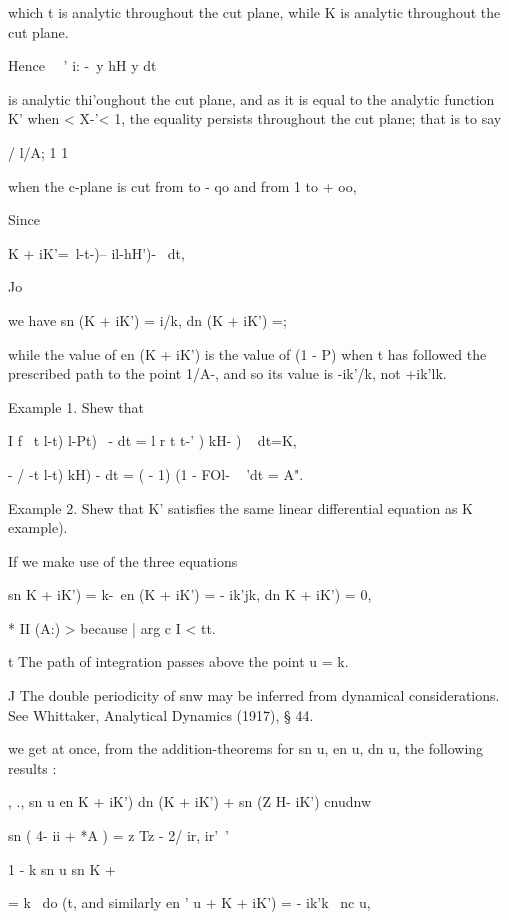 which t is analytic throughout the cut plane, while K is analytic
throughout the cut plane.

Hence \ \ ' i: -\ y hH y dt

is analytic thi'oughout the cut plane, and as it is equal to the
analytic function K' when < X-'< 1, the equality persists throughout
the cut plane; that is to say

/ l/A; 1 1

when the c-plane is cut from to - qo and from 1 to + oo,

Since

K + iK'=\ l-t-)-- il-hH')- ~dt,

Jo

we have sn (K + iK') = i/k, dn (K + iK') =;

while the value of en (K + iK') is the value of (1 - P) when t has
followed the prescribed path to the point 1/A-, and so its value is
-ik'/k, not +ik'lk.

Example 1. Shew that

I f \ t l-t) l-Pt) ~- dt = l r t t-' ) kH- ) ~ dt=K,

- / -t l-t) kH) - dt = ( - 1) (1 - FOl- ~ 'dt = A".

Example 2. Shew that K' satisfies the same linear differential
equation as K  example).


If we make use of the three equations

sn K + iK') = k-\ en (K + iK') = - ik'jk, dn K + iK') = 0,

* II (A:) > because | arg c I < tt.

t The path of integration passes above the point u = k.

J The double periodicity of snw may be inferred from dynamical
considerations. See Whittaker, Analytical Dynamics (1917), § 44.

%
%

we get at once, from the addition-theorems for sn u, en u, dn u, the
following results :

, ., sn u en K + iK') dn (K + iK') + sn (Z H- iK') cnudnw

sn ( 4- ii + *A ) = z Tz - 2/ ir, ir'\ '

  1 - k sn u sn K +%

= k~ do (t, and similarly en ' u + K + iK') = - ik'k~ nc u,

